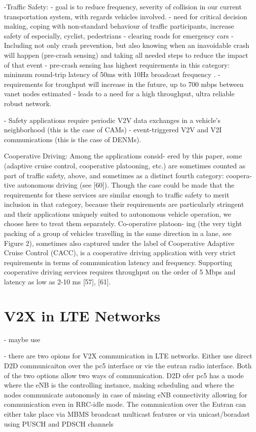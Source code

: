 \documentclass[conference,12pt,onecolumn]{IEEEtran}
\begin{document}
-Traffic Safety:
- goal is to reduce frequency, severity of collision in our current transportation system, with regards vehicles involved.
- need for critical decision making, coping with non-standard behaviour of traffic participants, increase safety of especially, cyclist, pedestrians
- clearing roads for emergency cars
- Including not only crash prevention, but also knowing when an inavoidable crash will happen (pre-crash sensing) and taking all needed steps to reduce the impact of that event \cite{machardy2018}
- pre-crash sensing has highest requirements in this category: minimum round-trip latency of 50ms with 10Hz broadcast frequency \cite{machardy2018}.
- requirements for troughput will increase in the future, up to 700 mbps between vanet nodes estimated \cite{machardy2018}
- leads to a need for a high throughput, ultra reliable robust network.

- Safety applications require periodic V2V data exchanges in a vehicle’s neighborhood (this is the case of CAMs) \cite{araniti2013}
- event-triggered V2V and V2I communications (this is the case of DENMs). \cite{araniti2013}

Cooperative Driving: Among the applications consid- ered by this paper, some (adaptive cruise control, cooperative platooning, etc.) are sometimes counted as part of traffic safety, above, and sometimes as a distinct fourth category: coopera- tive autonomous driving (see [60]). Though the case could be made that the requirements for these services are similar enough to traffic safety to merit inclusion in that category, because their requirements are particularly stringent and their applications uniquely suited to autonomous vehicle operation, we choose here to treat them separately. Co-operative platoon- ing (the very tight packing of a group of vehicles travelling in the same direction in a lane, see Figure 2), sometimes also captured under the label of Cooperative Adaptive Cruise Control (CACC), is a cooperative driving application with very strict requirements in terms of communication latency and frequency. Supporting cooperative driving services requires throughput on the order of 5 Mbps and latency as low as 2-10 ms [57], [61].

\section{V2X in LTE Networks}
-  maybe  use \cite{araniti2013}

- there are two opions for V2X communication in LTE networks. Either use direct D2D communicaiton over the pc5 interface or vie the eutran radio interface. Both of the two options allow two ways of communication. D2D ofer pc5 has a mode where the eNB is the controlling instance, making scheduling and where the nodes communicate autonomsly in case of missing eNB connectivity allowing for communication even in RRC-idle mode.
The commnication over the Eutran can either take place via MBMS broadcast multicast features or via unicast/boradast  using PUSCH and PDSCH channels
\end{document}
